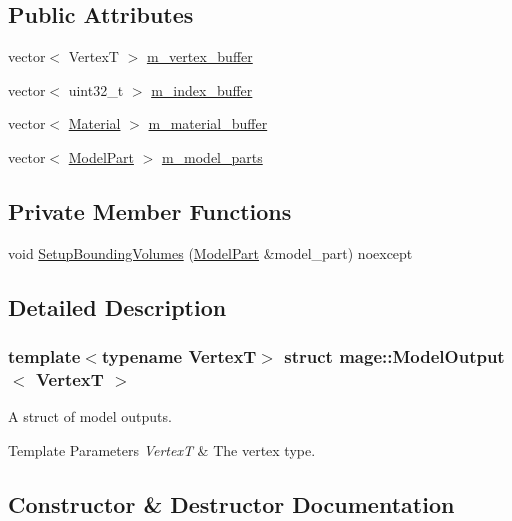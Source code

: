 \subsection*{Public Attributes}
\begin{DoxyCompactItemize}
\item 
vector$<$ VertexT $>$ \hyperlink{structmage_1_1_model_output_a4d669b5fee2d6a1bc993a94b0a2d5580}{m\+\_\+vertex\+\_\+buffer}
\item 
vector$<$ uint32\+\_\+t $>$ \hyperlink{structmage_1_1_model_output_afc6530c5fc47224b45d851e67dd5a306}{m\+\_\+index\+\_\+buffer}
\item 
vector$<$ \hyperlink{structmage_1_1_material}{Material} $>$ \hyperlink{structmage_1_1_model_output_a3bfdb493d92a83b40a8b363a96e89a0c}{m\+\_\+material\+\_\+buffer}
\item 
vector$<$ \hyperlink{structmage_1_1_model_part}{Model\+Part} $>$ \hyperlink{structmage_1_1_model_output_a86df369ff4959458ee6991c36e6aa01a}{m\+\_\+model\+\_\+parts}
\end{DoxyCompactItemize}
\subsection*{Private Member Functions}
\begin{DoxyCompactItemize}
\item 
void \hyperlink{structmage_1_1_model_output_aec05a0a43d141b8b8260e741314615c1}{Setup\+Bounding\+Volumes} (\hyperlink{structmage_1_1_model_part}{Model\+Part} \&model\+\_\+part) noexcept
\end{DoxyCompactItemize}


\subsection{Detailed Description}
\subsubsection*{template$<$typename VertexT$>$\newline
struct mage\+::\+Model\+Output$<$ Vertex\+T $>$}

A struct of model outputs.


\begin{DoxyTemplParams}{Template Parameters}
{\em VertexT} & The vertex type. \\
\hline
\end{DoxyTemplParams}


\subsection{Constructor \& Destructor Documentation}
\hypertarget{structmage_1_1_model_output_a7d64b57d8207968541eb9c6da6ef0163}{}\label{structmage_1_1_model_output_a7d64b57d8207968541eb9c6da6ef0163} 
